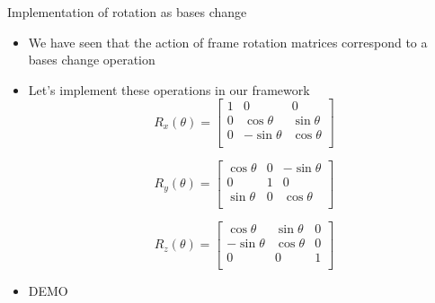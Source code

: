 \documentclass[presentation]{beamer}
\begin{document}
\begin{frame}[label={sec:org069e556}]{Implementation of rotation as bases change}
\begin{itemize}
\item We have seen that the action of frame rotation matrices correspond to a
bases change operation
\item Let's implement these operations in our framework
\[ R_{x}(\theta)={\begin{bmatrix}1&0&0\\0&\cos \theta &\sin \theta
     \\0&-\sin \theta &\cos \theta \\\end{bmatrix}}\]

\[ R_{y}(\theta)={\begin{bmatrix}\cos \theta & 0 & -\sin \theta\\
	 0&1&0 \\ \sin\theta & 0 & \cos \theta \\\end{bmatrix}} \]

\[R_{z}(\theta)={\begin{bmatrix}\cos \theta &\sin \theta &0\\-\sin
	 \theta &\cos\theta &0\\0&0&1\\\end{bmatrix}} \]
\item \alert{DEMO}
\end{itemize}
\end{frame}
\end{document}
